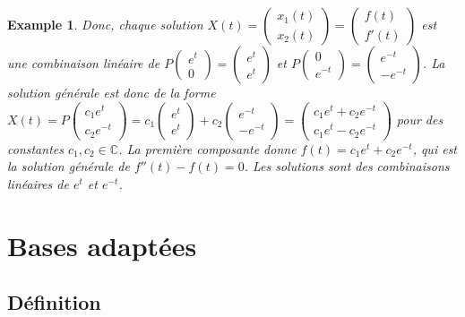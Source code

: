 \documentclass{article}
\newtheorem{example}{Example}
\begin{document}
\begin{example}
Donc, chaque solution $X(t) = \begin{pmatrix} x_1(t) \\ x_2(t) \end{pmatrix} = \begin{pmatrix} f(t) \\ f'(t) \end{pmatrix}$ est une combinaison linéaire de $P \begin{pmatrix} e^{t} \\ 0 \end{pmatrix} = \begin{pmatrix} e^{t} \\ e^{t} \end{pmatrix}$ et $P \begin{pmatrix} 0 \\ e^{-t} \end{pmatrix} = \begin{pmatrix} e^{-t} \\ -e^{-t} \end{pmatrix}$.
La solution générale est donc de la forme $X(t) = P \begin{pmatrix} c_1 e^{t} \\ c_2 e^{-t} \end{pmatrix} = c_1 \begin{pmatrix} e^{t} \\ e^{t} \end{pmatrix} + c_2 \begin{pmatrix} e^{-t} \\ -e^{-t} \end{pmatrix} = \begin{pmatrix} c_1 e^{t} + c_2 e^{-t} \\ c_1 e^{t} - c_2 e^{-t} \end{pmatrix}$ pour des constantes $c_1, c_2 \in \mathbb{C}$.
La première composante donne $f(t) = c_1 e^{t} + c_2 e^{-t}$, qui est la solution générale de $f''(t) - f(t) = 0$. Les solutions sont des combinaisons linéaires de $e^{t}$ et $e^{-t}$.
\end{example}

\section{Bases adaptées}

\subsection{Définition}
\end{document}
